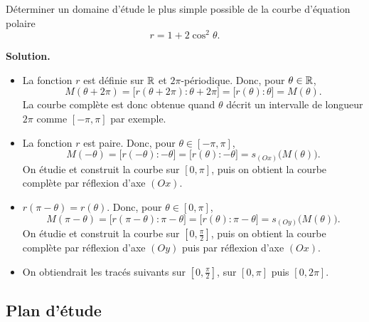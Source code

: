 \documentclass[class=report,crop=false]{standalone}
\begin{document}
\begin{exemple}

Déterminer un domaine d'étude le plus simple possible de la
courbe d'équation polaire
$$r=1+2\cos^2\theta.$$

\medskip
\textbf{Solution.}

\begin{itemize}
  \item La fonction $r$ est définie sur $\mathbb{R}$ et
$2\pi$-périodique. Donc, pour $\theta\in\mathbb{R}$,
$$M(\theta+2\pi)=\big[r(\theta+2\pi):\theta+2\pi\big]=\big[r(\theta):\theta\big]=M(\theta).$$
La courbe complète est donc obtenue quand $\theta$ décrit un
intervalle de longueur $2\pi$ comme $[-\pi,\pi]$ par exemple.

  \item La fonction $r$ est paire. Donc, pour $\theta\in[-\pi,\pi]$,
$$M(-\theta)=\big[r(-\theta):-\theta\big]=\big[r(\theta):-\theta\big]=s_{(Ox)}\big(M(\theta)\big).$$
On étudie et construit la courbe sur $[0,\pi]$, puis on obtient
la courbe complète par réflexion d'axe $(Ox)$.

  \item $r(\pi-\theta)=r(\theta)$. Donc, pour $\theta\in[0,\pi]$,
$$M(\pi-\theta)=\big[r(\pi-\theta):\pi-\theta\big]=\big[r(\theta):\pi-\theta\big]=s_{(Oy)}\big(M(\theta)\big).$$
On étudie et construit la courbe sur $[0,\frac{\pi}{2}]$,
puis on obtient la courbe complète par réflexion d'axe $(Oy)$ puis par
réflexion d'axe $(Ox)$.



  \item On obtiendrait les tracés suivants sur $[0,\frac{\pi}{2}]$,
sur $[0,\pi]$ puis $[0,2\pi]$.

\end{itemize}


\end{exemple}


\subsection{Plan d'étude}
\end{document}
